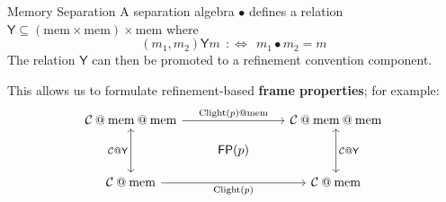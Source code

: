 \documentclass[aspectratio=1610,mathserif]{beamer}
\newcommand{\kw}[1]{\ensuremath{ \mathrm{#1} }}
\begin{document}
%
%
%

\begin{frame}[fragile]{Memory Separation}
  A separation algebra $\bullet$ defines a relation
  $\mathsf{Y} \subseteq (\kw{mem} \times \kw{mem}) \times \kw{mem}$
  where
  \[
    (m_1, m_2) \mathrel{\mathsf{Y}} m \:\: :\Leftrightarrow \:\:
    m_1 \bullet m_2 = m
  \]
  The relation $\mathsf{Y}$ can then be promoted
  to a refinement convention component.

  \pause \vfill
  This allows us to formulate refinement-based \textbf{frame properties};
  for example:
  \[
    \begin{tikzcd}[row sep=small]
      \mathcal{C} \mathbin@ \kw{mem} \mathbin@ \kw{mem}
        \ar[rr, "\kw{Clight}(p) \mathbin@ \kw{mem}"]
        \ar[dd, "\mathcal{C} \mathbin@ \mathsf{Y}"', leftrightarrow] &&
      \mathcal{C} \mathbin@ \kw{mem} \mathbin@ \kw{mem}
        \ar[dd, "\mathcal{C} \mathbin@ \mathsf{Y}", leftrightarrow]
      \\
      & \mathsf{FP}(p) &
      \\
      \mathcal{C} \mathbin@ \kw{mem}
        \ar[rr, "\kw{Clight}(p)"'] &&
      \mathcal{C} \mathbin@ \kw{mem}
    \end{tikzcd}
  \]
\end{frame}
\end{document}
